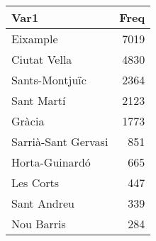 \begin{table}[H]
\centering
\begin{tabular}[t]{lr}
\toprule
Var1 & Freq\\
\midrule
Eixample & 7019\\
Ciutat Vella & 4830\\
Sants-Montjuïc & 2364\\
Sant Martí & 2123\\
Gràcia & 1773\\
\addlinespace
Sarrià-Sant Gervasi & 851\\
Horta-Guinardó & 665\\
Les Corts & 447\\
Sant Andreu & 339\\
Nou Barris & 284\\
\bottomrule
\end{tabular}
\end{table}